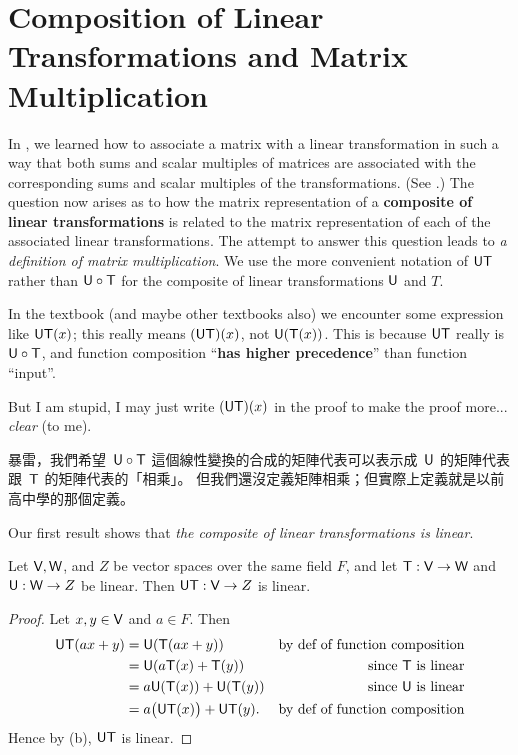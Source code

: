 \section{Composition of Linear Transformations and Matrix Multiplication} \label{sec 2.3}

In , we learned how to associate a matrix with a linear transformation in such a way that both sums and scalar multiples of matrices are associated with the corresponding sums and scalar multiples of the transformations.
(See .)
The question now arises as to how the matrix representation of a \textbf{composite of linear transformations} is related to the matrix representation of each of the associated linear transformations.
The attempt to answer this question leads to \emph{a definition of matrix multiplication}.
We use the more convenient notation of \(\textsf{U}\textsf{T}\) rather than \(\textsf{U} \circ \textsf{T}\) for the composite of linear transformations \(\textsf{U}\) and \(T\).

\begin{remark} \label{remark 2.3.1}
In the textbook (and maybe other textbooks also) we encounter some expression like \(\textsf{U}\textsf{T}(x)\);
this really means \((\textsf{U}\textsf{T})(x)\), not \(\textsf{U}(\textsf{T}(x))\).
This is because \(\textsf{U}\textsf{T}\) really is \(\textsf{U} \circ \textsf{T}\), and function composition ``\textbf{has higher precedence}'' than function ``input''.

But I am stupid, I may just write \((\textsf{U}\textsf{T})(x)\) in the proof to make the proof more... \emph{clear} (to me).
\end{remark}

\begin{note}
暴雷，我們希望\ \(\textsf{U} \circ \textsf{T}\) 這個線性變換的合成的矩陣代表可以表示成\ \(\textsf{U}\) 的矩陣代表跟\ \(\textsf{T}\) 的矩陣代表的「相乘」。
但我們還沒定義矩陣相乘；但實際上定義就是以前高中學的那個定義。
\end{note}

Our first result shows that \emph{the composite of linear transformations is linear}.

\begin{theorem} \label{thm 2.9}
Let \(\textsf{V}, \textsf{W}\), and \(Z\) be vector spaces over the same field \(F\), and let \(\textsf{T}: \textsf{V} \to \textsf{W}\) and \(\textsf{U} : \textsf{W} \to Z\) be linear.
Then \(\textsf{U}\textsf{T} : \textsf{V} \to Z\) is linear.
\end{theorem}

\begin{proof}
Let \(x, y \in \textsf{V}\) and \(a \in F\).
Then
\begin{align*}
    \textsf{U}\textsf{T}(ax + y) & = \textsf{U}(\textsf{T}(ax + y)) & \text{by def of function composition} \\
                 & = \textsf{U}(a\textsf{T}(x) + \textsf{T}(y)) & \text{since \(\textsf{T}\) is linear} \\
                & = a\textsf{U}(\textsf{T}(x)) + \textsf{U}(\textsf{T}(y)) & \text{since \(\textsf{U}\) is linear} \\
                & = a\big( \textsf{U}\textsf{T}(x) \big) + \textsf{U}\textsf{T}(y). & \text{by def of function composition}
\end{align*}
Hence by (b), \(\textsf{U}\textsf{T}\) is linear.
\end{proof}

